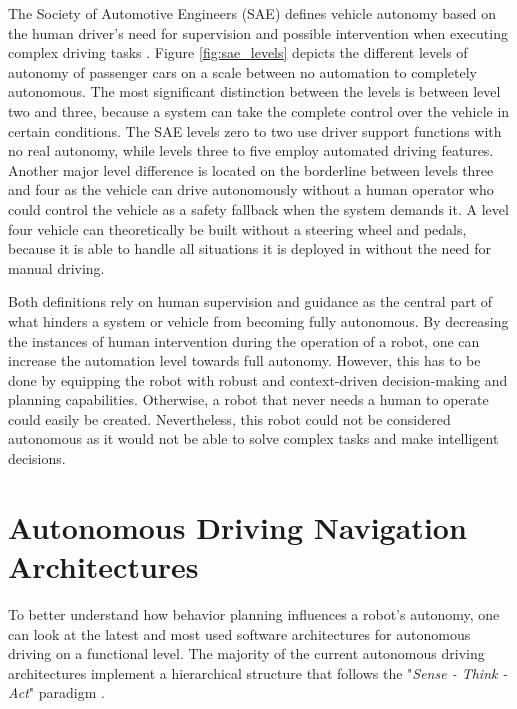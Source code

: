 The Society of Automotive Engineers (SAE) defines vehicle autonomy based on the human driver's need for supervision and possible intervention when executing complex driving tasks \cite{J3016_202104}. Figure \ref{fig:sae_levels} depicts the different levels of autonomy of passenger cars on a scale between no automation to completely autonomous. The most significant distinction between the levels is between level two and three, because a system can take the complete control over the vehicle in certain conditions. The SAE levels zero to two use driver support functions with no real autonomy, while levels three to five employ automated driving features.
Another major level difference is located on the borderline between levels three and four as the vehicle can drive autonomously without a human operator who could control the vehicle as a safety fallback when the system demands it. A level four vehicle can theoretically be built without a steering wheel and pedals, because it is able to handle all situations it is deployed in without the need for manual driving. 

Both definitions rely on human supervision and guidance as the central part of what hinders a system or vehicle from becoming fully autonomous. By decreasing the instances of human intervention during the operation of a robot, one can increase the automation level towards full autonomy. However, this has to be done by equipping the robot with robust and context-driven decision-making and planning capabilities. Otherwise, a robot that never needs a human to operate could easily be created. Nevertheless, this robot could not be considered autonomous as it would not be able to solve complex tasks and make intelligent decisions.



\section{Autonomous Driving Navigation Architectures}
\label{sec:Autonomous Driving Navigation Architectures}

To better understand how behavior planning influences a robot's autonomy, one can look at the latest and most used software architectures for autonomous driving on a functional level. The majority of the current autonomous driving architectures implement a hierarchical structure that follows the "\textit{Sense - Think - Act}" paradigm \cite{murphy2000}. 

